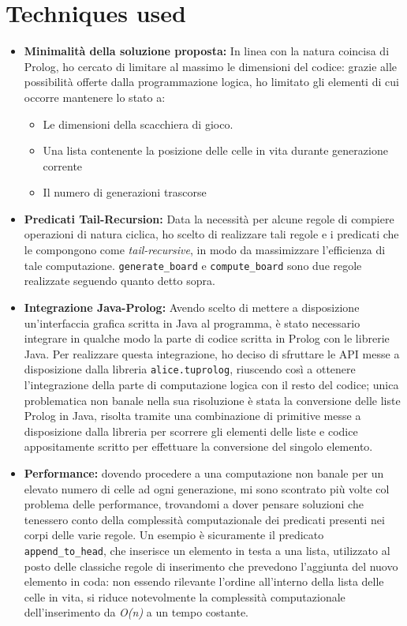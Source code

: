 \documentclass[10pt,italian]{article}
\begin{document}
\section{Techniques used}
\begin{itemize}
	\item \textbf{Minimalità della soluzione proposta:} In linea con la natura coincisa di Prolog, ho cercato di limitare al massimo le dimensioni del codice: grazie alle possibilità offerte dalla programmazione logica, ho limitato gli elementi di cui occorre mantenere lo stato a:
	\begin{itemize}
		\item Le dimensioni della scacchiera di gioco.
		\item Una lista contenente la posizione delle celle in vita durante generazione corrente
		\item Il numero di generazioni trascorse
	\end{itemize}
	\item \textbf{Predicati Tail-Recursion:} Data la necessità per alcune regole di compiere operazioni di natura ciclica, ho scelto di realizzare tali regole e i predicati che le compongono come \textit{tail-recursive}, in modo da massimizzare l'efficienza di tale computazione. \texttt{generate\_board} e \texttt{compute\_board} sono due regole realizzate seguendo quanto detto sopra.
	\item \textbf{Integrazione Java-Prolog:} Avendo scelto di mettere a disposizione un'interfaccia grafica scritta in Java al programma, è stato necessario integrare in qualche modo la parte di codice scritta in Prolog con le librerie Java. Per realizzare questa integrazione, ho deciso di sfruttare le API messe a disposizione dalla libreria \texttt{alice.tuprolog}, riuscendo così a ottenere l'integrazione della parte di computazione logica con il resto del codice; unica problematica non banale nella sua risoluzione è stata la conversione delle liste Prolog in Java, risolta tramite una combinazione di primitive messe a disposizione dalla libreria per scorrere gli elementi delle liste e codice appositamente scritto per effettuare la conversione del singolo elemento.
	\item \textbf{Performance:} dovendo procedere a una computazione non banale per un elevato numero di celle ad ogni generazione, mi sono scontrato più volte col problema delle performance, trovandomi a dover pensare soluzioni che tenessero conto della complessità computazionale dei predicati presenti nei corpi delle varie regole. Un esempio è sicuramente il predicato \texttt{append\_to\_head}, che inserisce un elemento in testa a una lista, utilizzato al posto delle classiche regole di inserimento che prevedono l'aggiunta del nuovo elemento in coda: non essendo rilevante l'ordine all'interno della lista delle celle in vita, si riduce notevolmente la complessità computazionale dell'inserimento da \textit{O(n)} a un tempo costante.\\
\end{itemize}
\end{document}

